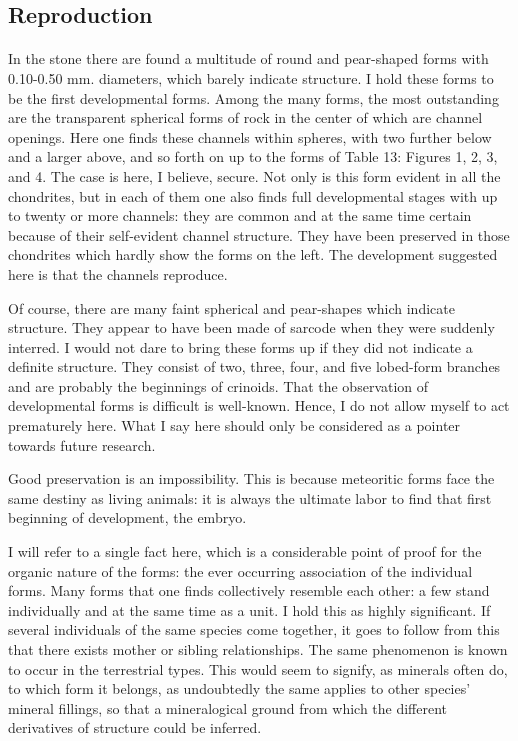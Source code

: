 \documentclass[a4paper, 11pt, oneside]{article}
\begin{document}
\subsection{Reproduction}
\paragraph{}
In the stone there are found a multitude of round and pear-shaped forms with 0.10-0.50 mm. diameters, which barely indicate structure. I hold these forms to be the first developmental forms. Among the many forms, the most outstanding are the transparent spherical forms of rock in the center of which are channel openings. Here one finds these channels within spheres, with two further below and a larger above, and so forth on up to the forms of Table 13: Figures 1, 2, 3, and 4. The case is here, I believe, secure. Not only is this form evident in all the chondrites, but in each of them one also finds full developmental stages with up to twenty or more channels: they are common and at the same time certain because of their self-evident channel structure. They have been preserved in those chondrites which hardly show the forms on the left. The development suggested here is that the channels reproduce.

Of course, there are many faint spherical and pear-shapes which indicate structure. They appear to have been made of sarcode when they were suddenly interred. I would not dare to bring these forms up if they did not indicate a definite structure. They consist of two, three, four, and five lobed-form branches and are probably the beginnings of crinoids. That the observation of developmental forms is difficult is well-known. Hence, I do not allow myself to act prematurely here. What I say here should only be considered as a pointer towards future research.

Good preservation is an impossibility. This is because meteoritic forms face the same destiny as living animals: it is always the ultimate labor to find that first beginning of development, the embryo.

I will refer to a single fact here, which is a considerable point of proof for the organic nature of the forms: the ever occurring association of the individual forms. Many forms that one finds collectively resemble each other: a few stand individually and at the same time as a unit. I hold this as highly significant. If several individuals of the same species come together, it goes to follow from this that there exists mother or sibling relationships. The same phenomenon is known to occur in the terrestrial types. This would seem to signify, as minerals often do, to which form it belongs, as undoubtedly the same applies to other species' mineral fillings, so that a mineralogical ground from which the different derivatives of structure could be inferred.
\clearpage
\end{document}
